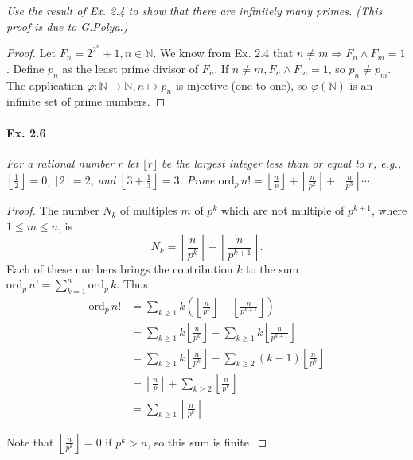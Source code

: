 \documentclass[11pt,a4paper]{article}
\newcommand{\N}{\mathbb{N}}
\newcommand{\ord}{\mathrm{ord}}
\begin{document}
{{\it Use the result of Ex. 2.4 to show that there are infinitely many primes. (This proof is due to G.Polya.)
}

\begin{proof}
Let $F_n = 2^{2^n} + 1, n\in \N$. We know from Ex. 2.4 that $n\ne m \Rightarrow F_n \wedge F_m = 1$.
Define $p_n$ as the least prime divisor of $F_n$. If $n \ne m , F_n \wedge F_m = 1$, so $p_n \ne p_m$. 
The application $\varphi : \N \to \N, n \mapsto p_n$ is injective (one to one), so $\varphi(\N)$ is an infinite set of prime numbers.
\end{proof}

\paragraph{Ex. 2.6}

{\it For a rational number $r$ let $\lfloor r \rfloor$ be the largest integer less than or equal to $r$, e.g., $\left \lfloor \frac{1}{2}\right \rfloor = 0$, $\lfloor 2\rfloor = 2$, and $\left \lfloor 3+\frac{1}{3} \right \rfloor=3$. Prove $\ord_p\,  n! =\left  \lfloor \frac{n}{p} \right \rfloor+\left  \lfloor \frac{n}{p^2} \right \rfloor+\left  \lfloor \frac{n}{p^3} \right \rfloor \cdots$.
}

\begin{proof}
The number $N_k$ of multiples $m$ of $p^k$ which are not multiple of $p^{k+1}$, where $1\leq m \leq n$, is 
$$N_k = \left \lfloor \frac{n}{p^k}\right \rfloor -\left \lfloor \frac{n}{p^{k+1}}\right \rfloor.$$
Each of these numbers brings the contribution $k$ to the sum $\ord_p\,  n! = \sum\limits_{k=1}^n \ord_p\,  k$.
Thus
\begin{align*}
\ord_p\,  n! &= \sum_{k\geq 1} k \left ( \left \lfloor \frac{n}{p^k}\right \rfloor -\left \lfloor \frac{n}{p^{k+1}}\right \rfloor  \right)\\
&=  \sum_{k\geq 1} k  \left \lfloor \frac{n}{p^k}\right \rfloor  - \sum_{k\geq 1}k \left \lfloor \frac{n}{p^{k+1}}\right \rfloor\\
&=  \sum_{k\geq 1} k  \left \lfloor \frac{n}{p^k}\right \rfloor  - \sum_{k\geq 2}(k-1) \left \lfloor \frac{n}{p^{k}}\right \rfloor\\
&= \left \lfloor \frac{n}{p}\right \rfloor  + \sum_{k\geq 2} \left \lfloor \frac{n}{p^{k}}\right \rfloor\\
&= \sum_{k\geq 1} \left \lfloor \frac{n}{p^{k}}\right \rfloor
\end{align*}

Note that $\left \lfloor \frac{n}{p^{k}}\right \rfloor = 0$ if $p^k >n$, so this sum is finite.
\end{proof}

}
\end{document}
